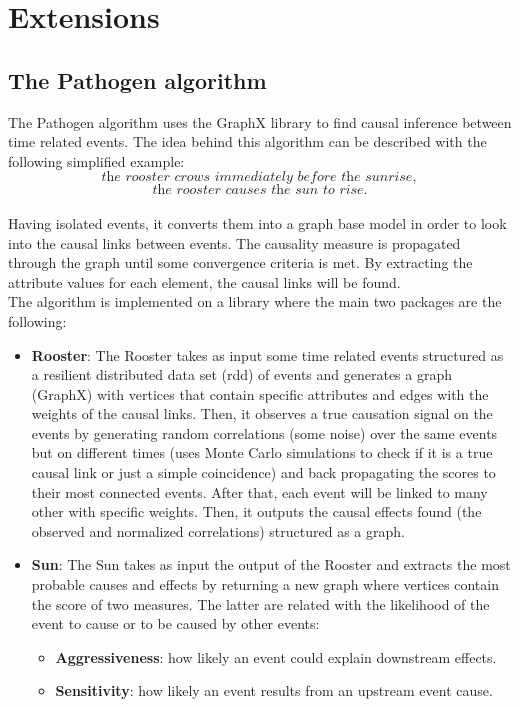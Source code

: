 \documentclass[a4, 11pt]{article}
\begin{document}
\section{Extensions}
\subsection{The Pathogen algorithm}
The Pathogen algorithm \cite{Pathogen} uses the GraphX library to find causal inference between time related events. The idea behind this algorithm can be described with the following simplified example: $$\textit{the rooster crows immediately before the sunrise},$$ $$\textit{the rooster causes the sun to rise.}$$\\
Having isolated events, it converts them into a graph base model in order to look into the causal links between events. The causality measure is propagated through the graph until some convergence criteria is met. By extracting the attribute values for each element, the causal links will be found. \\
The algorithm is implemented on a library where the main two packages are the following:
\begin{itemize}
    \item \textbf{Rooster}: The Rooster takes as input some time related events structured as a resilient distributed data set (rdd) of events and generates a graph (GraphX) with vertices that contain specific attributes and edges with the weights of the causal links. Then, it observes a true causation signal on the events by generating random correlations (some noise) over the same events but on different times (uses Monte Carlo simulations to check if it is a true causal link or just a simple coincidence) and back propagating the scores to their most connected events.
    After that, each event will be linked to many other with specific weights. 
    Then, it outputs the causal effects found (the observed and normalized correlations) structured as a graph.
  
    \item \textbf{Sun}: The Sun takes as input the output of the Rooster and extracts the most probable causes and effects by returning a new graph where vertices contain the score of two measures. The latter are related with the likelihood of the event to cause or to be caused by other events:

    
    \begin{itemize}
        \item \textbf{Aggressiveness}: how likely an event could explain downstream effects.
        \item \textbf{Sensitivity}: how likely an event results from an upstream event cause.
    \end{itemize}
    \end{itemize}
\end{document}
